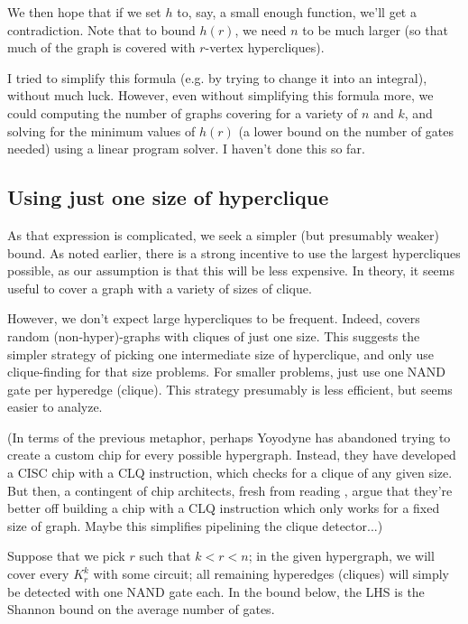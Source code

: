 \documentclass[12pt]{article}
\theoremstyle{definition}
\begin{document}
We then hope that if we set $h$ to, say, a small enough
function, we'll get a contradiction. Note that to bound $h(r)$, we need
$n$ to be much larger (so that much of the graph is covered with $r$-vertex
hypercliques).

I tried to simplify this formula (e.g. by trying to change it into an
integral), without much luck.
However, even
without simplifying this formula more, we could computing
the number of graphs covering for a variety of
 $n$ and $k$, and solving for the minimum values of
$h(r)$ (a lower bound on the
number of gates needed) using a linear program solver.
I haven't done this so far.

\subsection{Using just one size of hyperclique} \label{oneCliqueSize}

As that expression is complicated, we seek a simpler (but
presumably weaker) bound.
As noted earlier, there is a strong incentive to use the largest
hypercliques possible, as our assumption is that this will be less
expensive. In theory, it seems useful to cover a graph with a variety
of sizes of clique.

However, we don't expect large hypercliques to be frequent.
Indeed, \cite{bollobas1993clique} covers random (non-hyper)-graphs
with cliques of just
one size.
This suggests the simpler strategy of picking one intermediate
size of hyperclique,
and only use clique-finding for that size problems. For smaller problems,
just use one NAND gate per hyperedge (clique).
This strategy
presumably is less efficient, but seems easier to analyze.

(In terms of the previous metaphor, perhaps Yoyodyne has abandoned trying to
create a custom chip for every possible hypergraph. Instead, they have
developed a CISC chip
with a CLQ instruction, which checks for a clique
of any given size. But then, a contingent of chip architects, fresh from
reading \cite{hennessy2011computer}, argue that they're better off building
a chip with a CLQ instruction which only works for a fixed size of graph.
Maybe this simplifies pipelining the clique detector...)

Suppose that we pick $r$ such that $k < r < n$; in the given hypergraph,
we will cover every $K_r^k$ with some circuit; all remaining hyperedges
(cliques) will simply be detected with one NAND gate each.
In the bound below,
the LHS is the Shannon bound on the average number
of gates.
\end{document}
